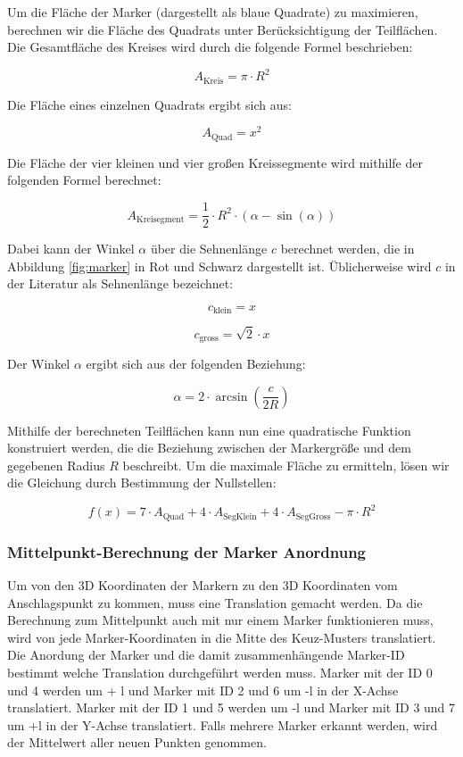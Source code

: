 Um die Fläche der Marker (dargestellt als blaue Quadrate) zu maximieren, berechnen wir die Fläche des Quadrats unter Berücksichtigung der Teilflächen. Die Gesamtfläche des Kreises wird durch die folgende Formel beschrieben:

\[
A_\text{Kreis} = \pi \cdot R^2
\]

Die Fläche eines einzelnen Quadrats ergibt sich aus:

\[
A_{\text{Quad}} = x^2
\]

Die Fläche der vier kleinen und vier großen Kreissegmente wird mithilfe der folgenden Formel berechnet:

\[
A_\text{Kreisegment} = \frac{1}{2} \cdot R^2 \cdot (\alpha - \sin(\alpha))
\]

Dabei kann der Winkel \(\alpha\) über die Sehnenlänge \(c\) berechnet werden, die in Abbildung \ref{fig:marker} in Rot und Schwarz dargestellt ist. Üblicherweise wird \(c\) in der Literatur als Sehnenlänge bezeichnet:

\[
c_\text{klein} = x
\]

\[
c_\text{gross} = \sqrt{2} \cdot x
\]

Der Winkel \(\alpha\) ergibt sich aus der folgenden Beziehung:

\[
\alpha = 2 \cdot \arcsin\left(\frac{c}{2R}\right)
\]

Mithilfe der berechneten Teilflächen kann nun eine quadratische Funktion konstruiert werden, die die Beziehung zwischen der Markergröße und dem gegebenen Radius \(R\) beschreibt. Um die maximale Fläche zu ermitteln, lösen wir die Gleichung durch Bestimmung der Nullstellen:

\[
f(x) = 7 \cdot A_\text{Quad} + 4 \cdot A_\text{SegKlein} + 4 \cdot A_\text{SegGross} - \pi \cdot R^2
\]


\subsubsection{Mittelpunkt-Berechnung der Marker Anordnung}
\label{sec:middlePoint}

Um von den 3D Koordinaten der Markern zu den 3D Koordinaten vom Anschlagspunkt zu kommen, muss eine Translation gemacht werden. Da die Berechnung zum Mittelpunkt auch mit nur einem Marker funktionieren muss, wird von jede Marker-Koordinaten in die Mitte des Keuz-Musters translatiert. Die Anordung der Marker und die damit zusammenhängende Marker-ID bestimmt welche Translation durchgeführt werden muss. Marker mit der ID 0 und 4 werden um + l und Marker mit ID 2 und 6 um -l in der X-Achse translatiert. Marker mit der ID 1 und 5 werden um -l und Marker mit ID 3 und 7 um +l in der Y-Achse translatiert. Falls mehrere Marker erkannt werden, wird der Mittelwert aller neuen Punkten genommen.

